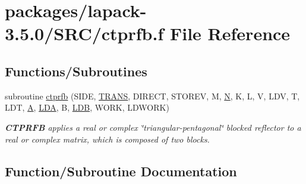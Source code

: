 \hypertarget{ctprfb_8f}{}\section{packages/lapack-\/3.5.0/\+S\+R\+C/ctprfb.f File Reference}
\label{ctprfb_8f}
\subsection*{Functions/\+Subroutines}
\begin{DoxyCompactItemize}
\item 
subroutine \hyperlink{ctprfb_8f_a1870011d9f6b3b3df73c361a3236942f}{ctprfb} (S\+I\+D\+E, \hyperlink{superlu__enum__consts_8h_a0c4e17b2d5cea33f9991ccc6a6678d62a1f61e3015bfe0f0c2c3fda4c5a0cdf58}{T\+R\+A\+N\+S}, D\+I\+R\+E\+C\+T, S\+T\+O\+R\+E\+V, M, \hyperlink{polmisc_8c_a0240ac851181b84ac374872dc5434ee4}{N}, K, L, V, L\+D\+V, T, L\+D\+T, \hyperlink{classA}{A}, \hyperlink{example__user_8c_ae946da542ce0db94dced19b2ecefd1aa}{L\+D\+A}, B, \hyperlink{example__user_8c_a50e90a7104df172b5a89a06c47fcca04}{L\+D\+B}, W\+O\+R\+K, L\+D\+W\+O\+R\+K)
\begin{DoxyCompactList}\small\item\em {\bfseries C\+T\+P\+R\+F\+B} applies a real or complex \char`\"{}triangular-\/pentagonal\char`\"{} blocked reflector to a real or complex matrix, which is composed of two blocks. \end{DoxyCompactList}\end{DoxyCompactItemize}


\subsection{Function/\+Subroutine Documentation}
\hypertarget{ctprfb_8f_a1870011d9f6b3b3df73c361a3236942f}{}
